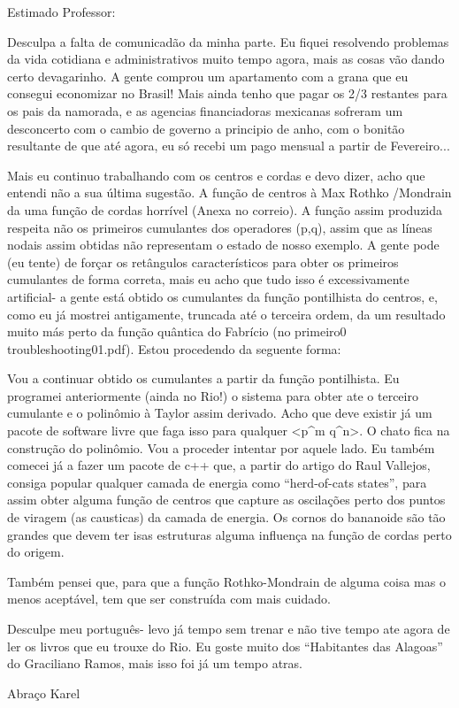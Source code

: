 Estimado Professor:

Desculpa a falta de comunicadão da minha parte. Eu fiquei resolvendo problemas 
da vida cotidiana e administrativos muito tempo agora, mais as cosas vão dando
certo devagarinho. A gente comprou um apartamento com a grana que eu consegui 
economizar no Brasil! Mais ainda tenho que pagar os 2/3 restantes para os
 pais da namorada, e as agencias financiadoras mexicanas sofreram um desconcerto
com o cambio de governo a principio de anho, com o bonitão resultante
de que até agora, eu só recebi um pago mensual a partir de Fevereiro...


Mais eu continuo trabalhando com os centros e cordas e devo dizer, acho que entendi não
a sua última sugestão. A função de centros à Max Rothko /Mondrain da uma função
de cordas horrível (Anexa no correio). A função assim produzida respeita não
os primeiros cumulantes dos operadores (p,q), assim que as líneas nodais
assim obtidas não representam o estado de nosso exemplo. A gente pode
(eu tente) de forçar os retângulos característicos para obter os primeiros
cumulantes de forma correta, mais eu acho que tudo isso é excessivamente
artificial- a gente está obtido os cumulantes da função pontilhista
do centros, e, como eu já mostrei antigamente, truncada até o terceira ordem,
da um resultado muito más perto da função quântica do Fabrício (no primeiro0 
troubleshooting01.pdf). Estou procedendo da seguente forma:

Vou a continuar obtido os cumulantes a partir da função pontilhista.
Eu programei anteriormente (ainda no Rio!) o sistema para obter ate 
o terceiro cumulante e o polinômio à Taylor assim derivado. Acho que deve
existir já um pacote de software livre que faga isso para qualquer
<p^m  q^n>. O chato fica na construção do polinômio. 
 Vou a proceder intentar por aquele lado. Eu também comecei já a
fazer um pacote de c++ que, a partir do artigo do Raul Vallejos, consiga
popular qualquer camada de energia como ``herd-of-cats states'', para 
assim obter alguma função de centros que capture as oscilações perto
dos puntos de viragem (as causticas) da camada de energia. Os
cornos do bananoide são tão grandes que devem ter isas estruturas
alguma influença na função de cordas perto do origem.

Também pensei que, para que a função Rothko-Mondrain de alguma coisa
mas o menos aceptável, tem que ser construída com mais cuidado.

Desculpe meu português- levo já tempo sem trenar e não tive tempo ate agora
de ler os livros que eu trouxe do Rio. Eu goste muito dos ``Habitantes
das Alagoas'' do Graciliano Ramos, mais isso foi já um tempo atras.

Abraço
Karel

